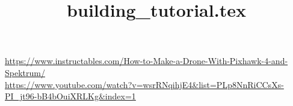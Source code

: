 \documentclass[a4paper]{article}
\title{building\_tutorial.tex}
\date{}
\begin{document}
    \maketitle
    \url{https://www.instructables.com/How-to-Make-a-Drone-With-Pixhawk-4-and-Spektrum/}
    \\
    \url{https://www.youtube.com/watch?v=wsrRNqihjE4&list=PLp8NnRiCCsXs-PI_jt96-bB4bOuiXRLKg&index=1}
    
\end{document}
